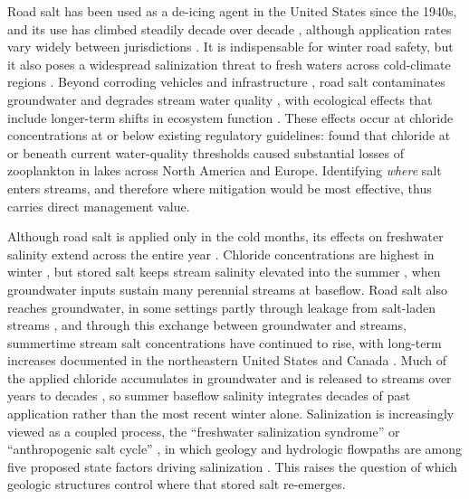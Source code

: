 \documentclass{article}
\begin{document}
Road salt has been used as a de-icing agent in the United States since the 1940s, and its use has climbed steadily decade over decade \citep{tiwari2018,jackson2005}, although application rates vary widely between jurisdictions \citep{jamshidi2020}. It is indispensable for winter road safety, but it also poses a widespread salinization threat to fresh waters across cold-climate regions \citep{kaushal2005,dugan2023}. Beyond corroding vehicles and infrastructure \citep{kelting2010}, road salt contaminates groundwater and degrades stream water quality \citep{jackson2005,williams1999}, with ecological effects that include longer-term shifts in ecosystem function \citep{findlay2011}. These effects occur at chloride concentrations at or below existing regulatory guidelines: \citet{hintz2022} found that chloride at or beneath current water-quality thresholds caused substantial losses of zooplankton in lakes across North America and Europe. Identifying \emph{where} salt enters streams, and therefore where mitigation would be most effective, thus carries direct management value.

Although road salt is applied only in the cold months, its effects on freshwater salinity extend across the entire year \citep{shattuck2023}. Chloride concentrations are highest in winter \citep{corsi2015}, but stored salt keeps stream salinity elevated into the summer \citep{kelly2008}, when groundwater inputs sustain many perennial streams at baseflow. Road salt also reaches groundwater, in some settings partly through leakage from salt-laden streams \citep{rivett2016}, and through this exchange between groundwater and streams, summertime stream salt concentrations have continued to rise, with long-term increases documented in the northeastern United States and Canada \citep{williams1999,kaushal2005}. Much of the applied chloride accumulates in groundwater and is released to streams over years to decades \citep{vanmeter2024}, so summer baseflow salinity integrates decades of past application rather than the most recent winter alone. Salinization is increasingly viewed as a coupled process, the ``freshwater salinization syndrome'' \citep{kaushal2018} or ``anthropogenic salt cycle'' \citep{kaushal2023saltcycle}, in which geology and hydrologic flowpaths are among five proposed state factors driving salinization \citep{kaushal2023factors}. This raises the question of which geologic structures control where that stored salt re-emerges.
\end{document}
